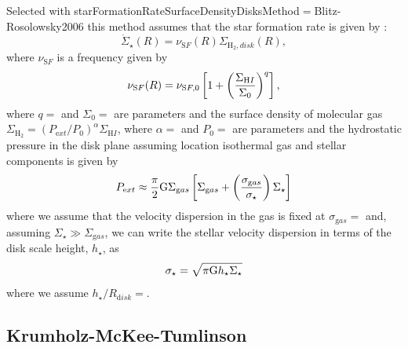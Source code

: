 Selected with {\normalfont \ttfamily starFormationRateSurfaceDensityDisksMethod}$=${\normalfont \ttfamily Blitz-Rosolowsky2006} this method assumes that the star formation rate is given by \citep{blitz_role_2006}:
\begin{equation}
 \dot{\Sigma}_\star(R) = \nu_{\mathrm SF}(R) \Sigma_{\mathrm H_2, disk}(R),
\end{equation}
where $\nu_{\mathrm SF}$ is a frequency given by
\begin{equation}
 \nu_{\mathrm SF}(R) = \nu_{\mathrm SF,0} \left[ 1 + \left({\Sigma_{\mathrm HI}\over \Sigma_0}\right)^q \right],
\end{equation}
where $q=${\normalfont \ttfamily [surfaceDensityExponentBlitzRosolowsky]} and $\Sigma_0=${\normalfont \ttfamily [surfaceDensityCriticalBlitzRosolowsky]} are parameters and the surface density of molecular gas $\Sigma_{\mathrm H_2} = (P_{\mathrm ext}/P_0)^\alpha \Sigma_{\mathrm HI}$, where $\alpha=${\normalfont \ttfamily [pressureExponentBlitzRosolowsky]} and $P_0=${\normalfont \ttfamily [pressureCharacteristicBlitzRosolowsky]} are parameters and the hydrostatic pressure in the disk plane assuming location isothermal gas and stellar components is given by
\begin{equation}
 P_{\mathrm ext} \approx {\pi\over 2} \G \Sigma_{\mathrm gas} \left[ \Sigma_{\mathrm gas} + \left({\sigma_{\mathrm gas}\over \sigma_\star}\right)\Sigma_\star\right]
\end{equation}
where we assume that the velocity dispersion in the gas is fixed at $\sigma_{\mathrm gas}=${\normalfont \ttfamily [velocityDispersionDiskGas]} and, assuming $\Sigma_\star \gg \Sigma_{\mathrm gas}$, we can write the stellar velocity dispersion in terms of the disk scale height, $h_\star$, as
\begin{equation}
 \sigma_\star = \sqrt{\pi \G h_\star \Sigma_\star}
\end{equation}
where we assume $h_\star/R_{\mathrm disk}=${\normalfont \ttfamily [heightToRadialScaleDiskBlitzRosolowsky]}.

\subsection{Krumholz-McKee-Tumlinson}\label{sec:StarFormationKMT09}

